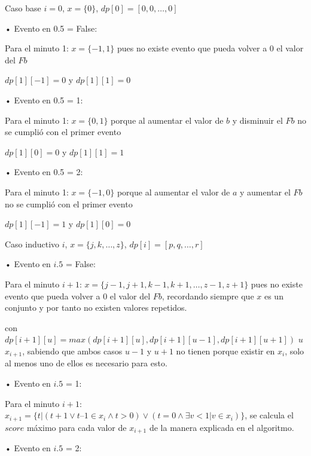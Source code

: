 \documentclass[12pt,a4paper]{report}
\begin{document}
\bigskip

Caso base $i = 0$, $x = \{0\}$, $dp[0] = [0, 0, …, 0]$

\medskip

• Evento en 0.5 = False:

Para el minuto 1: $x = \{-1, 1\}$ pues no existe evento que pueda volver a 0 el valor del $Fb$

\smallskip

$dp[1][-1] = 0$ y $dp[1][1] = 0$

\medskip

• Evento en 0.5 = 1:

Para el minuto 1: $x = \{0, 1\}$ porque al aumentar el valor de $b$ y disminuir el $Fb$ no se cumplió con el primer evento

\smallskip

$dp[1][0] = 0$ y $dp[1][1] = 1$

\medskip

• Evento en 0.5 = 2:

Para el minuto 1: $x = \{-1, 0\}$ porque al aumentar el valor de $a$ y aumentar el $Fb$ no se cumplió con el primer evento

\smallskip

$dp[1][-1] = 1$ y $dp[1][0] = 0$

\bigskip

Caso inductivo $i$, $x = \{j, k, …, z\}$, $dp[i] = [p, q, …, r]$

\medskip

• Evento en $i.5$ = False:

Para el minuto $i+1$: $x = \{j-1, j+1, k-1, k+1, …, z-1, z+1\}$ pues no existe evento que pueda volver a 0 el valor del $Fb$, recordando siempre que $x$ es un conjunto y por tanto no existen valores repetidos.

con $dp[i+1][u] = max(dp[i+1][u], dp[i+1][u-1], dp[i+1][u+1])$ \forall $u$ \in $x_{i+1}$, sabiendo que ambos casos $u-1$ y $u+1$ no tienen porque existir en $x_i$, solo al menos uno de ellos es necesario para esto.

\medskip

• Evento en $i.5$ = 1:

Para el minuto $i+1$: $x_{i+1} = \{t | (t + 1 \lor t – 1 \in x_i \land t > 0) \lor (t = 0 \land \exists v < 1 | v \in x_i)\}$, se calcula el $score$ máximo para cada valor de $x_{i+1}$ de la manera explicada en el algoritmo.

\medskip

• Evento en $i.5$ = 2:
\end{document}
